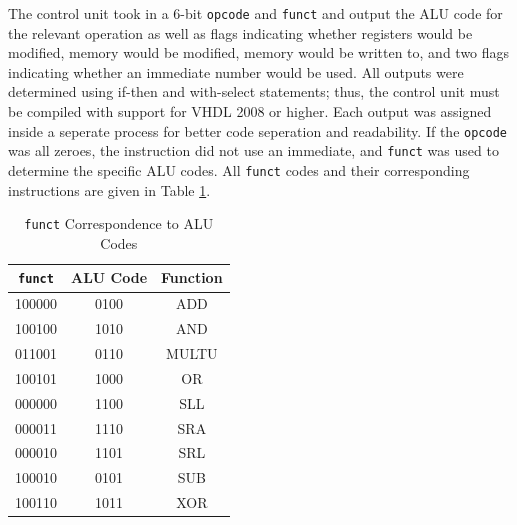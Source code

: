 \documentclass[CMPE]{KGCOEReport}
\begin{document}
\begin{table}[H]

	The control unit took in a 6-bit \texttt{opcode} and \texttt{funct} and
	output the ALU code for the relevant operation as well as flags indicating
	whether registers would be modified, memory would be modified, memory would
	be written to, and two flags indicating whether an immediate number would
	be used. All outputs were determined using if-then and with-select
	statements; thus, the control unit must be compiled with support for VHDL
	2008 or higher. Each output was assigned inside a seperate process for
	better code seperation and readability. If the \texttt{opcode} was all
	zeroes, the instruction did not use an immediate, and \texttt{funct} was
	used to determine the specific ALU codes. All \texttt{funct} codes and
	their corresponding instructions are given in Table \ref{tab:funct}.

	\center
	\caption{\texttt{funct} Correspondence to ALU Codes}
	\begin{tabular}{|c|c|c|}
		\hline
		\texttt{funct} & ALU Code & Function \\
		\hline
		\hline
		100000         & 0100     & ADD      \\
		\hline
		100100         & 1010     & AND      \\
		\hline
		011001         & 0110     & MULTU    \\
		\hline
		100101         & 1000     & OR       \\
		\hline
		000000         & 1100     & SLL      \\
		\hline
		000011         & 1110     & SRA      \\
		\hline
		000010         & 1101     & SRL      \\
		\hline
		100010         & 0101     & SUB      \\
		\hline
		100110         & 1011     & XOR      \\
		\hline
	\end{tabular}
	\label{tab:funct}
\end{table}
\end{document}
